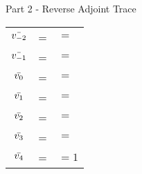 \documentclass{article}
\begin{document}
\begin{center}

Part 2 - Reverse Adjoint Trace
\end{center}
\begin{center}
\begin{tabular}{ c l l }
$\Bar{v_{-2}}$ & = \hspace{200pt} & $=$  \\
$\Bar{v_{-1}}$ & = \hspace{200pt} & $=$  \\
$\Bar{v_0}$ & = \hspace{200pt} & $= $  \\
\hline
$\Bar{v_1}$ & = \hspace{200pt} & $=$ \\
$\Bar{v_2}$ & = \hspace{200pt}  & $=$ \\
$\Bar{v_3}$ & = \hspace{200pt} & $=$ \\
\hline
$\Bar{v_4}$ & = \hspace{200pt} & $=1$
\end{tabular}
\end{center}

\end{document}
